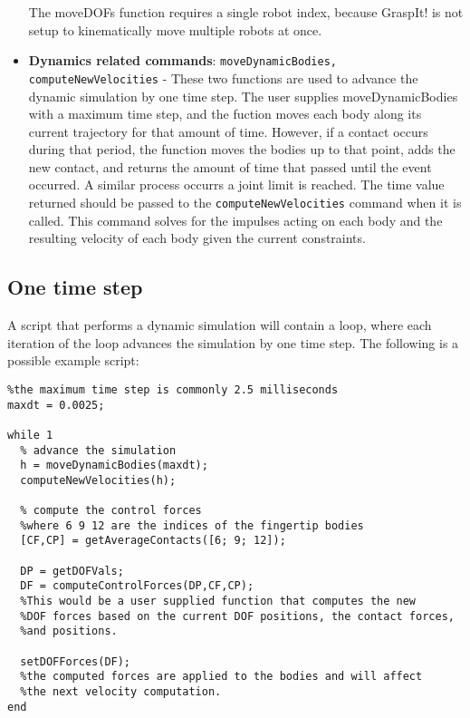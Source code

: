\begin{itemize}
The moveDOFs function requires a single robot index, because GraspIt!
is not setup to kinematically move multiple robots at once.  

\item \textbf{Dynamics related commands}: \texttt{moveDynamicBodies,
  computeNewVelocities} - These two functions are used to advance the
  dynamic simulation by one time step. The user supplies
  moveDynamicBodies with a maximum time step, and the fuction moves
  each body along its current trajectory for that amount of
  time. However, if a contact occurs during that period, the function
  moves the bodies up to that point, adds the new contact, and returns
  the amount of time that passed until the event occurred. A similar
  process occurrs a joint limit is reached. The time value returned
  should be passed to the \texttt{computeNewVelocities} command when
  it is called. This command solves for the impulses acting on each
  body and the resulting velocity of each body given the current
  constraints.
\end{itemize}

\subsection{One time step}

A script that performs a dynamic simulation will contain a loop, where
each iteration of the loop advances the simulation by one time
step. The following is a possible example script:

\begin{verbatim}
%the maximum time step is commonly 2.5 milliseconds
maxdt = 0.0025;  
      		
while 1
  % advance the simulation	
  h = moveDynamicBodies(maxdt);
  computeNewVelocities(h);
      		  
  % compute the control forces
  %where 6 9 12 are the indices of the fingertip bodies
  [CF,CP] = getAverageContacts([6; 9; 12]);  

  DP = getDOFVals;
  DF = computeControlForces(DP,CF,CP);
  %This would be a user supplied function that computes the new
  %DOF forces based on the current DOF positions, the contact forces,
  %and positions.

  setDOFForces(DF);   
  %the computed forces are applied to the bodies and will affect 
  %the next velocity computation.
end
\end{verbatim}

